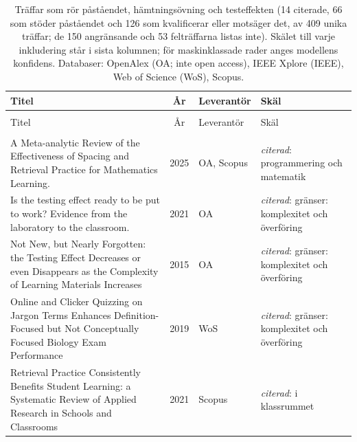 
\begingroup\footnotesize
\begin{longtable}{@{}%
  >{\raggedright\arraybackslash}p{}c%
  >{\raggedright\arraybackslash}p{}%
  >{\raggedright\arraybackslash}p{}@{}}
\caption{Träffar som rör påståendet, hämtningsövning och testeffekten (14 citerade, 66 som stöder påståendet och 126 som kvalificerar eller motsäger det, av 409 unika träffar; de 150 angränsande och 53 felträffarna listas inte). Skälet till varje inkludering står i sista kolumnen; för maskinklassade rader anges modellens konfidens. Databaser: OpenAlex (OA; inte open access), IEEE Xplore (IEEE), Web of Science (WoS), Scopus.}\label{tab:sok-recap-retrieval}\\
\toprule
Titel & År & Leverantör & Skäl \\
\midrule
\endfirsthead
\multicolumn{4}{@{}l}{\emph{\tablename~\thetable{} (forts.)}}\\
\toprule
Titel & År & Leverantör & Skäl \\
\midrule
\endhead
\midrule \multicolumn{4}{r@{}}{\emph{forts.\ på nästa sida}}\\
\endfoot
\bottomrule
\endlastfoot
A Meta-analytic Review of the Effectiveness of Spacing and Retrieval Practice for Mathematics Learning. & 2025 & OA, Scopus & \emph{citerad}: programmering och matematik \\
Is the testing effect ready to be put to work? Evidence from the laboratory to the classroom. & 2021 & OA & \emph{citerad}: gränser: komplexitet och överföring \\
Not New, but Nearly Forgotten: the Testing Effect Decreases or even Disappears as the Complexity of Learning Materials Increases & 2015 & OA & \emph{citerad}: gränser: komplexitet och överföring \\
Online and Clicker Quizzing on Jargon Terms Enhances Definition-Focused but Not Conceptually Focused Biology Exam Performance & 2019 & WoS & \emph{citerad}: gränser: komplexitet och överföring \\
Retrieval Practice Consistently Benefits Student Learning: a Systematic Review of Applied Research in Schools and Classrooms & 2021 & Scopus & \emph{citerad}: i klassrummet \\

\end{longtable}
